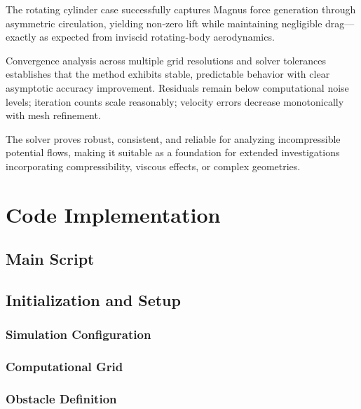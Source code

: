 The rotating cylinder case successfully captures Magnus force generation through asymmetric circulation, yielding non-zero lift while maintaining negligible drag—exactly as expected from inviscid rotating-body aerodynamics.

Convergence analysis across multiple grid resolutions and solver tolerances establishes that the method exhibits stable, predictable behavior with clear asymptotic accuracy improvement. Residuals remain below computational noise levels; iteration counts scale reasonably; velocity errors decrease monotonically with mesh refinement.

The solver proves robust, consistent, and reliable for analyzing incompressible potential flows, making it suitable as a foundation for extended investigations incorporating compressibility, viscous effects, or complex geometries.

\newpage
\appendix
\section{Code Implementation}

\subsection{Main Script}


\subsection{Initialization and Setup}

\subsubsection{Simulation Configuration}


\subsubsection{Computational Grid}


\subsubsection{Obstacle Definition}


